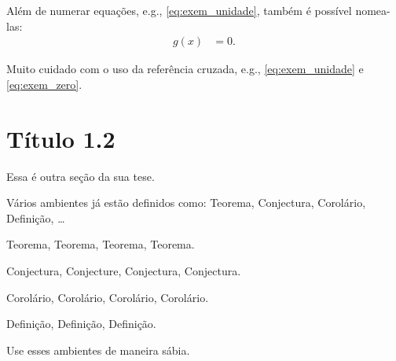 Além de numerar equações, e.g., \eqref{eq:exem_unidade}, também é
possível nomea-las:
\begin{align}
    g(x) &= 0.
    \tag{EIN}
    \label{eq:exem_zero}
\end{align}

Muito cuidado com o uso da referência cruzada, e.g.,
\eqref{eq:exem_unidade} e \eqref{eq:exem_zero}.

\section{Título 1.2}
Essa é outra seção da sua tese.

Vários ambientes já estão definidos como: Teorema, Conjectura, Corolário,
Definição, \ldots

\begin{thm}
Teorema, Teorema, Teorema, Teorema.
\end{thm}

\begin{con}
Conjectura, Conjecture, Conjectura, Conjectura.
\end{con}

\begin{cor}
Corolário, Corolário, Corolário, Corolário.
\end{cor}

\begin{dfn}
Definição, Definição, Definição.
\end{dfn}

Use esses ambientes de maneira sábia.
